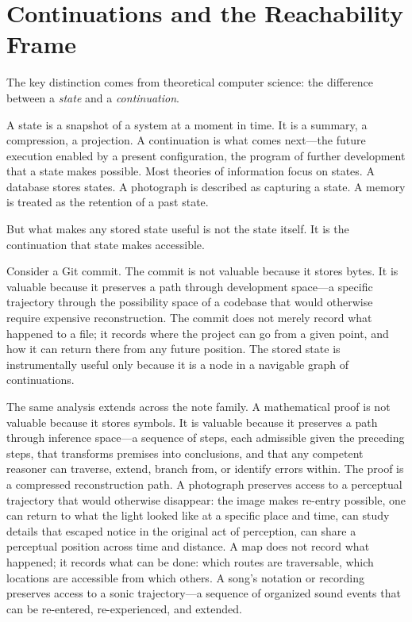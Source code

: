 \documentclass[12pt, a4paper]{article}
\theoremstyle{plain}
\theoremstyle{definition}
\theoremstyle{remark}
\begin{document}
\section{Continuations and the Reachability Frame}

The key distinction comes from theoretical computer science: the difference between
a \emph{state} and a \emph{continuation}.

A state is a snapshot of a system at a moment in time. It is a summary, a
compression, a projection. A continuation is what comes next---the future execution
enabled by a present configuration, the program of further development that a
state makes possible. Most theories of information focus on states. A database
stores states. A photograph is described as capturing a state. A memory is treated
as the retention of a past state.

But what makes any stored state useful is not the state itself. It is the
continuation that state makes accessible.

Consider a Git commit. The commit is not valuable because it stores bytes. It is
valuable because it preserves a path through development space---a specific
trajectory through the possibility space of a codebase that would otherwise require
expensive reconstruction. The commit does not merely record what happened to a
file; it records where the project can go from a given point, and how it can return
there from any future position. The stored state is instrumentally useful only
because it is a node in a navigable graph of continuations.

The same analysis extends across the note family. A mathematical proof is not
valuable because it stores symbols. It is valuable because it preserves a path
through inference space---a sequence of steps, each admissible given the preceding
steps, that transforms premises into conclusions, and that any competent reasoner
can traverse, extend, branch from, or identify errors within. The proof is a
compressed reconstruction path. A photograph preserves access to a perceptual
trajectory that would otherwise disappear: the image makes re-entry possible, one
can return to what the light looked like at a specific place and time, can study
details that escaped notice in the original act of perception, can share a
perceptual position across time and distance. A map does not record what happened;
it records what can be done: which routes are traversable, which locations are
accessible from which others. A song's notation or recording preserves access to a
sonic trajectory---a sequence of organized sound events that can be re-entered,
re-experienced, and extended.
\end{document}
